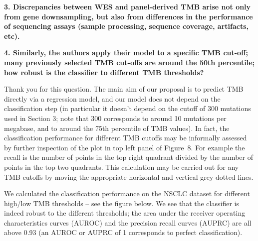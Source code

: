 \documentclass[12pt]{article}
\begin{document}
\textbf{3. Discrepancies between WES and panel-derived TMB arise not only from gene downsampling, but also from differences in the performance of sequencing assays (sample processing, sequence coverage, artifacts, etc).}

 

\textbf{4. Similarly, the authors apply their model to a specific TMB cut-off; many previously selected TMB cut-offs are around the 50th percentile; how robust is the classifier to different TMB thresholds?}

Thank you for this question.  The main aim of our proposal is to predict TMB directly via a regression model, and our model does not depend on the classification step (in particular it doesn't depend on the cutoff of 300 mutations used in Section 3;  note that 300 corresponds to around 10 mutations per megabase, and to around the 75th percentile of TMB values).  In fact, the classification performance for different TMB cutoffs may be informally assessed by further inspection of the plot in top left panel of Figure~8.  For example the recall is the number of points in the top right quadrant divided by the number of points in the top two quadrants.  This calculation may be carried out for any TMB cutoffs by moving the appropriate horizontal and vertical grey dotted lines. 

We calculated the classification performance on the NSCLC dataset for different high/low TMB thresholds -- see the figure below.   We see that the classifier is indeed robust to the different thresholds; the area under the receiver operating characteristics curves (AUROC) and the precision recall curves (AUPRC) are all above 0.93 (an AUROC or AUPRC of 1 corresponds to perfect classification).  %
\end{document}
